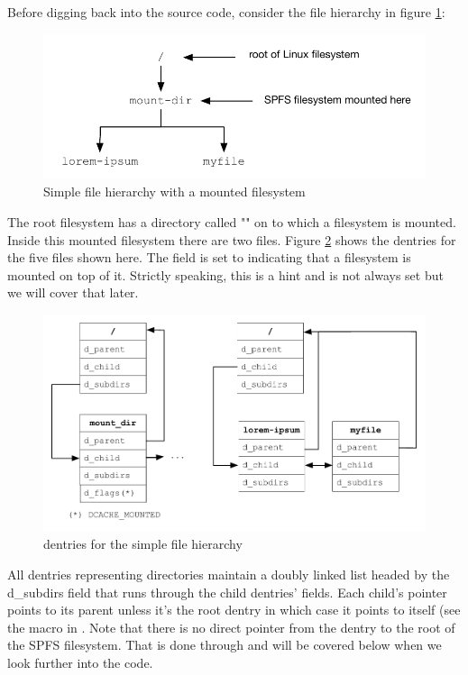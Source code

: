 Before digging back into the source code, consider the file hierarchy in figure \ref{fig:pathname-tree}:

\begin{figure}[h]
	\includegraphics[scale=0.6]{figures/pathname-tree.pdf}
	\centering
	\caption{Simple file hierarchy with a mounted filesystem}
	\label{fig:pathname-tree}
\end{figure}

\noindent
The root filesystem has a directory called "" on to which a filesystem is mounted. Inside this mounted filesystem there are two files. Figure \ref{fig:pathname-dentries} shows the dentries for the five files shown here. The  field is set to  indicating that a filesystem is mounted on top of it. Strictly speaking, this is a hint and is not always set but we will cover that later.

\begin{figure}[h]
	\includegraphics[scale=0.6]{figures/pathname-dentries.pdf}
	\centering
	\caption{dentries for the simple file hierarchy}
	\label{fig:pathname-dentries}
\end{figure}

\noindent
All dentries representing directories maintain a doubly linked list headed by the d\_subdirs field that runs through the child dentries'  fields. Each child's  pointer points to its parent unless it's the root dentry in which case it points to itself (see the  macro in . Note that there is no direct pointer from the  dentry to the root of the SPFS filesystem. That is done through  and will be covered below when we look further into the code.


